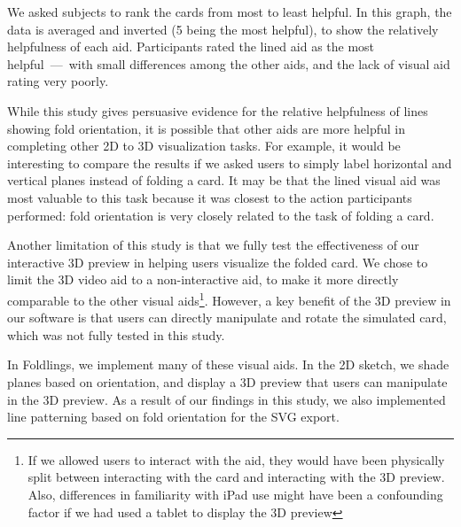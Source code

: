 
We asked subjects to rank the cards from most to least helpful. In this
graph, the data is averaged and inverted (5 being the most helpful), to
show the relatively helpfulness of each aid. Participants rated the
lined aid as the most helpful~---~with small differences among the other
aids, and the lack of visual aid rating very poorly.

While this study gives persuasive evidence for the relative helpfulness
of lines showing fold orientation, it is possible that other aids are
more helpful in completing other 2D to 3D visualization tasks. For
example, it would be interesting to compare the results if we asked
users to simply label horizontal and vertical planes instead of folding
a card. It may be that the lined visual aid was most valuable to this
task because it was closest to the action participants performed: fold
orientation is very closely related to the task of folding a card.

Another limitation of this study is that we fully test the effectiveness
of our interactive 3D preview in helping users visualize the folded
card. We chose to limit the 3D video aid to a non-interactive aid, to
make it more directly comparable to the other visual aids\footnote{If we
  allowed users to interact with the aid, they would have been
  physically split between interacting with the card and interacting
  with the 3D preview. Also, differences in familiarity with iPad use
  might have been a confounding factor if we had used a tablet to
  display the 3D preview}. However, a key benefit of the 3D preview in
our software is that users can directly manipulate and rotate the
simulated card, which was not fully tested in this study.

In Foldlings, we implement many of these visual aids. In the 2D sketch,
we shade planes based on orientation, and display a 3D preview that
users can manipulate in the 3D preview. As a result of our findings in
this study, we also implemented line patterning based on fold
orientation for the SVG export.
